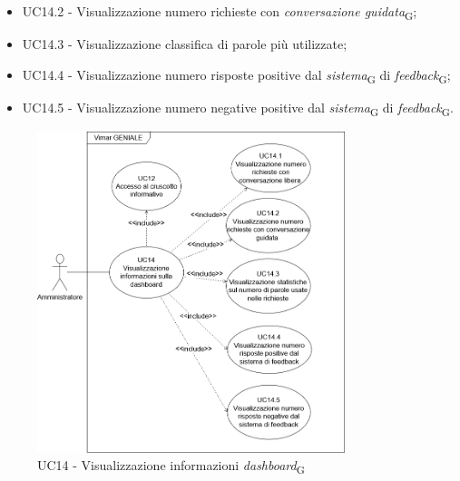 \begin{itemize}
\begin{itemize}
        \item UC14.2 - Visualizzazione numero richieste con \textit{conversazione guidata}\textsubscript{G};
        \item UC14.3 - Visualizzazione classifica di parole più utilizzate;
        \item UC14.4 - Visualizzazione numero risposte positive dal \textit{sistema}\textsubscript{G} di \textit{feedback}\textsubscript{G};
        \item UC14.5 - Visualizzazione numero negative positive dal \textit{sistema}\textsubscript{G} di \textit{feedback}\textsubscript{G}.
    \end{itemize}
\end{itemize}
\begin{figure}[H]
\centering
\includegraphics[width=0.8\textwidth]{contents/casi_duso/png/UC14.png}
\caption{UC14 - Visualizzazione informazioni \textit{dashboard}\textsubscript{G}}
\end{figure}

